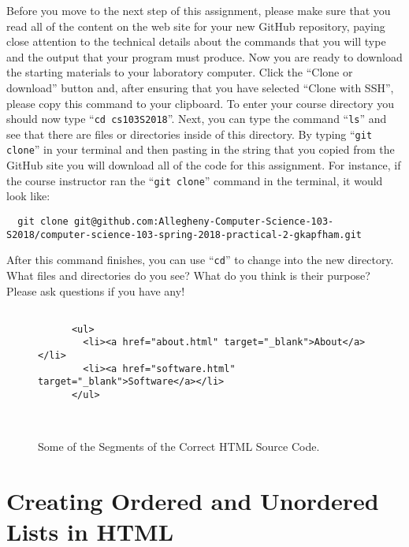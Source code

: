\documentclass[11pt]{article}
\newcommand{\command}[1]{``\lstinline{#1}''}
\begin{document}
Before you move to the next step of this assignment, please make sure that you read all of the content on the web site
for your new GitHub repository, paying close attention to the technical details about the commands that you will type
and the output that your program must produce. Now you are ready to download the starting materials to your laboratory
computer. Click the ``Clone or download'' button and, after ensuring that you have selected ``Clone with SSH'', please
copy this command to your clipboard. To enter your course directory you should now type \command{cd cs103S2018}. Next,
you can type the command \command{ls} and see that there are files or directories inside of this directory. By typing
\command{git clone} in your terminal and then pasting in the string that you copied from the GitHub site you will
download all of the code for this assignment. For instance, if the course instructor ran the \command{git clone} command
in the terminal, it would look like:

\begin{lstlisting}
  git clone git@github.com:Allegheny-Computer-Science-103-S2018/computer-science-103-spring-2018-practical-2-gkapfham.git
\end{lstlisting}

After this command finishes, you can use \command{cd} to change into the new directory. What files and directories do
you see? What do you think is their purpose? Please ask questions if you have any!

\begin{figure}[t]
  \centering

  \begin{verbatim}

      <ul>
        <li><a href="about.html" target="_blank">About</a></li>
        <li><a href="software.html" target="_blank">Software</a></li>
      </ul>

  \end{verbatim}

  \vspace*{-3em}

  \caption{Some of the Segments of the Correct HTML Source Code.}~\label{fig:correct}

  \vspace*{-2em}

\end{figure}

\section*{Creating Ordered and Unordered Lists in HTML}
\end{document}
